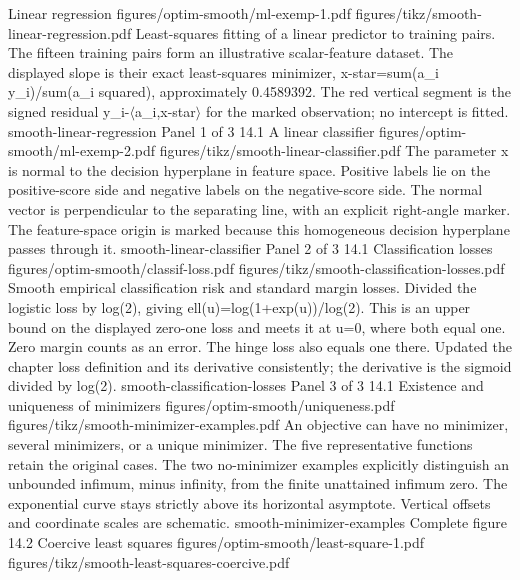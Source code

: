 {Linear regression}
{figures/optim-smooth/ml-exemp-1.pdf}
{figures/tikz/smooth-linear-regression.pdf}
{Least-squares fitting of a linear predictor to training pairs.}
{The fifteen training pairs form an illustrative scalar-feature dataset. The displayed slope is their exact least-squares minimizer, x-star=sum(a\_i y\_i)/sum(a\_i squared), approximately 0.4589392. The red vertical segment is the signed residual y\_i-\ensuremath{\langle}a\_i,x-star\ensuremath{\rangle} for the marked observation; no intercept is fitted.}
{smooth-linear-regression}
{Panel 1 of 3}
{14.1}
{A linear classifier}
{figures/optim-smooth/ml-exemp-2.pdf}
{figures/tikz/smooth-linear-classifier.pdf}
{The parameter x is normal to the decision hyperplane in feature space.}
{Positive labels lie on the positive-score side and negative labels on the negative-score side. The normal vector is perpendicular to the separating line, with an explicit right-angle marker. The feature-space origin is marked because this homogeneous decision hyperplane passes through it.}
{smooth-linear-classifier}
{Panel 2 of 3}
{14.1}
{Classification losses}
{figures/optim-smooth/classif-loss.pdf}
{figures/tikz/smooth-classification-losses.pdf}
{Smooth empirical classification risk and standard margin losses.}
{Divided the logistic loss by log(2), giving ell(u)=log(1+exp(u))/log(2). This is an upper bound on the displayed zero-one loss and meets it at u=0, where both equal one. Zero margin counts as an error. The hinge loss also equals one there. Updated the chapter loss definition and its derivative consistently; the derivative is the sigmoid divided by log(2).}
{smooth-classification-losses}
{Panel 3 of 3}
{14.1}
{Existence and uniqueness of minimizers}
{figures/optim-smooth/uniqueness.pdf}
{figures/tikz/smooth-minimizer-examples.pdf}
{An objective can have no minimizer, several minimizers, or a unique minimizer.}
{The five representative functions retain the original cases. The two no-minimizer examples explicitly distinguish an unbounded infimum, minus infinity, from the finite unattained infimum zero. The exponential curve stays strictly above its horizontal asymptote. Vertical offsets and coordinate scales are schematic.}
{smooth-minimizer-examples}
{Complete figure}
{14.2}
{Coercive least squares}
{figures/optim-smooth/least-square-1.pdf}
{figures/tikz/smooth-least-squares-coercive.pdf}
